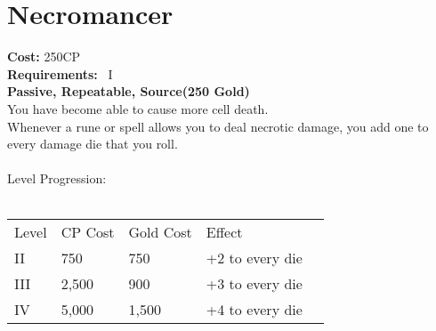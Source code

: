 \section{Necromancer}\label{perk:necromancer}
\textbf{Cost:} 250CP\\
\textbf{Requirements:}~ I\\
\textbf{Passive, Repeatable, Source(250 Gold)}\\
You have become able to cause more cell death.\\
Whenever a rune or spell allows you to deal necrotic damage, you add one to every damage die that you roll.\\
\\
Level Progression:\\
\\
\begin{tabular}{l | l | l | l | l}
    Level & CP Cost & Gold Cost &  Effect\\
    II & 750 & 750 & +2 to every die\\
    III & 2,500 & 900 & +3 to every die\\
    IV & 5,000 & 1,500 & +4 to every die\\
\end{tabular}